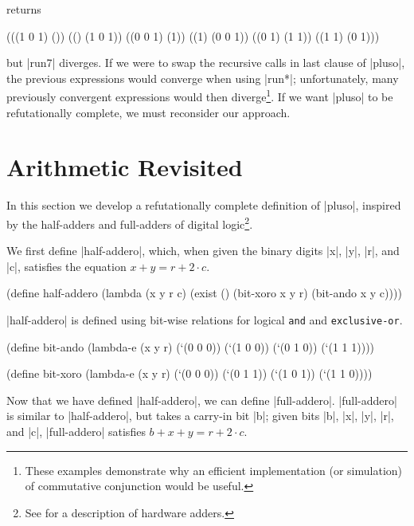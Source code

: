 \noindent returns

\schemedisplayspace
\begin{schemeresponse}
(((1 0 1) ())
 (() (1 0 1))
 ((0 0 1) (1))
 ((1) (0 0 1))
 ((0 1) (1 1))
 ((1 1) (0 1)))
\end{schemeresponse}

\noindent but \scheme|run7| diverges. If we were to swap the recursive
calls in last clause of \scheme|pluso|, the previous expressions would
converge when using \scheme|run*|; unfortunately, many previously
convergent expressions would then diverge\footnote{These examples
  demonstrate why an efficient implementation (or simulation) of
  commutative conjunction would be useful.}.  If we want
\scheme|pluso| to be refutationally complete, we must reconsider our
approach.


\section{Arithmetic Revisited}\label{arithrevisited}

In this section we develop a refutationally complete definition of
\scheme|pluso|, inspired by the half-adders and full-adders of digital
logic\footnote{See \citet{hennessy-computer} for a description of
  hardware adders.}.

We first define \scheme|half-addero|, which, when given the binary
digits \scheme|x|, \scheme|y|, \scheme|r|, and \scheme|c|, satisfies
the equation $x + y = r + 2 \cdot c$.  

\schemedisplayspace
\begin{schemedisplay}
(define half-addero
  (lambda (x y r c)
    (exist ()
      (bit-xoro x y r)
      (bit-ando x y c))))
\end{schemedisplay}

\scheme|half-addero| is defined using bit-wise relations for logical
{\tt and} and {\tt exclusive-or}.

\schemedisplayspace
\begin{schemedisplay}
(define bit-ando
  (lambda-e (x y r)
    (`(0 0 0))
    (`(1 0 0))
    (`(0 1 0))
    (`(1 1 1))))
\end{schemedisplay}

\begin{schemedisplay}
(define bit-xoro
  (lambda-e (x y r)
    (`(0 0 0))
    (`(0 1 1))
    (`(1 0 1))
    (`(1 1 0))))
\end{schemedisplay}

Now that we have defined \scheme|half-addero|, we can define
\scheme|full-addero|.  \scheme|full-addero| is similar to
\scheme|half-addero|, but takes a carry-in bit \scheme|b|; given bits
\scheme|b|, \scheme|x|, \scheme|y|, \scheme|r|, and \scheme|c|,
\scheme|full-addero| satisfies $b + x + y = r + 2 \cdot c$.

